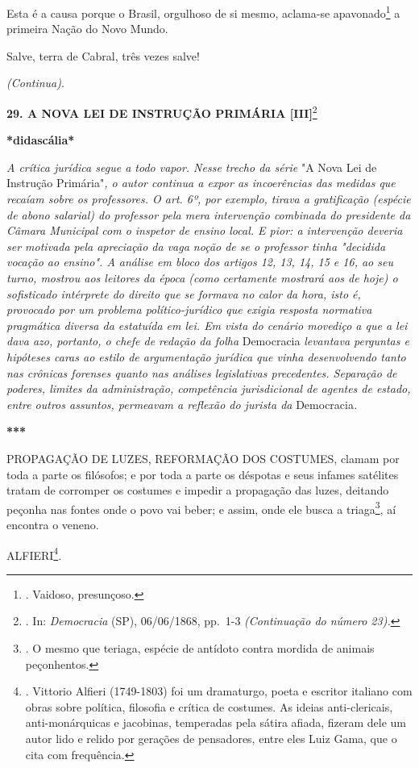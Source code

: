 Esta é a causa porque o Brasil, orgulhoso de si mesmo, aclama-se
apavonado\footnote{. Vaidoso, presunçoso.} a primeira Nação do Novo
Mundo.

Salve, terra de Cabral, três vezes salve!

\emph{(Continua)}.

\textbf{29. A NOVA LEI DE INSTRUÇÃO PRIMÁRIA {[}III{]}}\footnote{. In:
  \emph{Democracia} (SP), 06/06/1868, pp.~1-3 \emph{(Continuação do
  número 23).}}

\textbf{*didascália*}

\emph{A crítica jurídica segue a todo vapor. Nesse trecho da série} "A
Nova Lei de Instrução Primária"\emph{, o autor continua a expor as
incoerências das medidas que recaíam sobre os professores. O art. 6º,
por exemplo, tirava a gratificação (espécie de abono salarial) do
professor pela mera intervenção combinada do presidente da Câmara
Municipal com o inspetor de ensino local. E pior: a intervenção deveria
ser motivada pela apreciação da vaga noção de se o professor tinha
"decidida vocação ao ensino". A análise em bloco dos artigos 12, 13, 14,
15 e 16, ao seu turno, mostrou aos leitores da época (como certamente
mostrará aos de hoje) o sofisticado intérprete do direito que se formava
no calor da hora, isto é, provocado por um problema político-jurídico
que exigia resposta normativa pragmática diversa da estatuída em lei. Em
vista do cenário movediço a que a lei dava azo, portanto, o chefe de
redação da folha} Democracia \emph{levantava perguntas e hipóteses caras
ao estilo de argumentação jurídica que vinha desenvolvendo tanto nas
crônicas forenses quanto nas análises legislativas precedentes.
Separação de poderes, limites da administração, competência
jurisdicional de agentes de estado, entre outros assuntos, permeavam a
reflexão do jurista da} Democracia\emph{.}

\textbf{***}

PROPAGAÇÃO DE LUZES, REFORMAÇÃO DOS COSTUMES, clamam por toda a parte os
filósofos; e por toda a parte os déspotas e seus infames satélites
tratam de corromper os costumes e impedir a propagação das luzes,
deitando peçonha nas fontes onde o povo vai beber; e assim, onde ele
busca a triaga\footnote{. O mesmo que teriaga, espécie de antídoto
  contra mordida de animais peçonhentos.}, aí encontra o veneno.

ALFIERI\footnote{. Vittorio Alfieri (1749-1803) foi um dramaturgo, poeta
  e escritor italiano com obras sobre política, filosofia e crítica de
  costumes. As ideias anti-clericais, anti-monárquicas e jacobinas,
  temperadas pela sátira afiada, fizeram dele um autor lido e relido por
  gerações de pensadores, entre eles Luiz Gama, que o cita com
  frequência.}.

